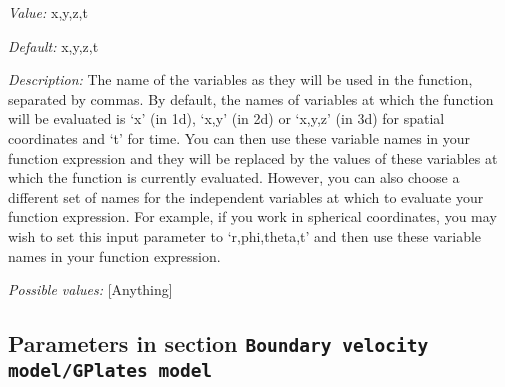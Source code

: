 \begin{itemize}
{\it Value:} x,y,z,t


{\it Default:} x,y,z,t


{\it Description:} The name of the variables as they will be used in the function, separated by commas. By default, the names of variables at which the function will be evaluated is `x' (in 1d), `x,y' (in 2d) or `x,y,z' (in 3d) for spatial coordinates and `t' for time. You can then use these variable names in your function expression and they will be replaced by the values of these variables at which the function is currently evaluated. However, you can also choose a different set of names for the independent variables at which to evaluate your function expression. For example, if you work in spherical coordinates, you may wish to set this input parameter to `r,phi,theta,t' and then use these variable names in your function expression.


{\it Possible values:} [Anything]
\end{itemize}

\subsection{Parameters in section \tt Boundary velocity model/GPlates model}
\label{parameters:Boundary_20velocity_20model/GPlates_20model}

